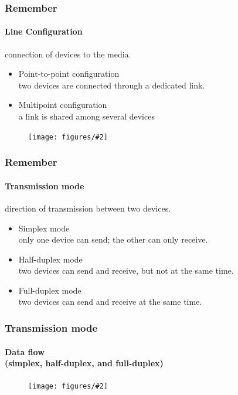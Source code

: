 \documentclass{beamer}
\newcommand{\fig}[2]{
\begin{center}
\begin{figure}
\texttt{[image: figures/\#2]}
\end{figure}
\end{center}
}
\begin{document}


\begin{frame}
\frametitle{\HandPencilLeft  Remember}
\framesubtitle{Line Configuration}
connection of devices to the media.
\begin{itemize} 
\Large
\item <1-> Point-to-point configuration \\ two devices are connected through a dedicated link.
\item <2-> Multipoint configuration \\ a link is shared among several devices
\end{itemize}
\fig{0.35}{line_config}
\end{frame}


\begin{frame}
\frametitle{\HandPencilLeft  Remember}
\framesubtitle{Transmission mode}
direction of transmission between two devices.
\begin{itemize} 
\Large
\item <1-> Simplex mode \\ only one device can send; the other can only receive.
\item <2-> Half-duplex mode \\ two devices can send and receive, but not at the same time.
\item <3-> Full-duplex mode \\ two devices can send and receive at the same time.
\end{itemize}
\end{frame}

\begin{frame}
\frametitle{Transmission mode}
\framesubtitle{Data flow \\ (simplex, half-duplex, and full-duplex) }
\fig{0.5}{data_flow}
\end{frame}
\end{document}
